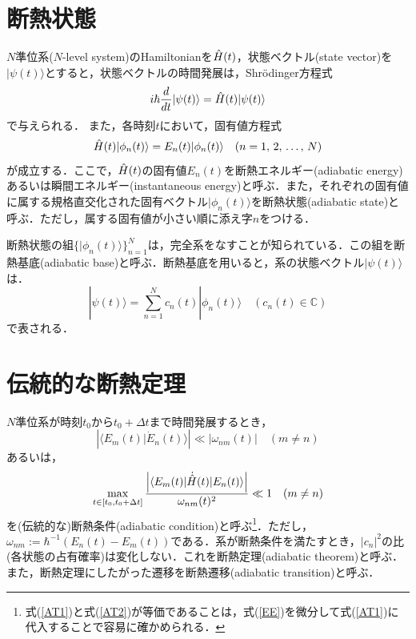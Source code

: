 \documentclass[a4paper, titlepage]{jsreport}
\begin{document}
\section{断熱状態}
$N$準位系($N$-level system)のHamiltonianを$\Hat{H}(t)$，状態ベクトル(state vector)を$|\psi(t)\rangle$とすると，状態ベクトルの時間発展は，Shr\"{o}dinger方程式
  \begin{equation}
  \label{SE}
    i\hbar \frac{d}{dt} |\psi(t) \rangle = \Hat{H}(t) |\psi(t) \rangle
  \end{equation}
で与えられる．
また，各時刻$t$において，固有値方程式
\begin{equation} 
  \Hat{H}(t) |\phi_n(t) \rangle = E_n(t) |\phi_n(t) \rangle \quad (n = 1,\,2,\,\ldots,\,N) \label{EE}
\end{equation}
が成立する．ここで，$\Hat{H}(t)$の固有値$E_n(t)$を断熱エネルギー(adiabatic energy)あるいは瞬間エネルギー(instantaneous energy)と呼ぶ．また，それぞれの固有値に属する規格直交化された固有ベクトル$|\phi_n(t) \rangle$を断熱状態(adiabatic state)と呼ぶ．ただし，属する固有値が小さい順に添え字$n$をつける．


断熱状態の組$\{|\phi_n(t) \rangle\}_{n=1}^N$は，完全系をなすことが知られている．この組を断熱基底(adiabatic base)と呼ぶ．断熱基底を用いると，系の状態ベクトル$|\psi(t)\rangle$は．
\begin{equation}
  |\psi(t) \rangle = \sum_{n=1}^{N} c_n(t) |\phi_n(t)\rangle  \quad (c_n(t) \in \mathbb{C})
\end{equation}
で表される．
\section{伝統的な断熱定理}
$N$準位系が時刻$t_0$から$t_0+\Delta t$まで時間発展するとき，
\begin{equation} \label{AT1}
  \left| \langle E_m(t) | \Dot{E}_n(t) \rangle \right| \ll \left| \omega_{nm}(t) \right| \quad (m\ne n)
\end{equation}
あるいは，
\begin{equation} \label{AT2}
  \max_{t\in [t_0, t_0+\Delta t]} \frac{\left| \langle E_m(t) |\Dot{\Hat{H}}(t)| E_n(t) \rangle \right|}{\omega_{nm}(t)^2} \ll 1 \quad (m\ne n)
\end{equation}
を(伝統的な)断熱条件(adiabatic condition)と呼ぶ\footnote{式(\ref{AT1})と式(\ref{AT2})が等価であることは，式(\ref{EE})を微分して式(\ref{AT1})に代入することで容易に確かめられる．}．ただし，$\omega_{nm} := \hbar^{-1} \left( E_n(t)-E_m(t) \right)$である．系が断熱条件を満たすとき，$|c_n|^2$の比(各状態の占有確率)は変化しない．これを断熱定理(adiabatic theorem)と呼ぶ．また，断熱定理にしたがった遷移を断熱遷移(adiabatic transition)と呼ぶ．
\end{document}
